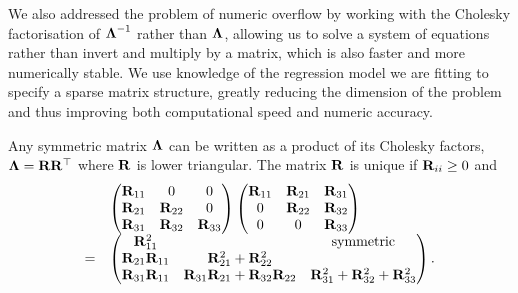 We also addressed the problem of numeric overflow by working with the Cholesky
factorisation of ${\boldsymbol \Lambda}^{-1}$ rather than ${\boldsymbol \Lambda}$, allowing us to solve a
system of equations rather than invert and multiply by a matrix, which is also
faster and more numerically stable. We use knowledge of the regression  model
we are fitting to specify a sparse matrix structure, greatly reducing the
dimension of   the problem and thus improving both computational speed and
numeric accuracy.

	
Any symmetric matrix ${\boldsymbol \Lambda}$ can be written as a product of its Cholesky
factors, ${\boldsymbol \Lambda} = {\bf R} {\bf R}^\top$ where ${\bf R}$ is lower triangular. The matrix
${\bf R}$ is unique if ${\bf R}_{ii} \geq 0$ and
\begin{equation*}
\label{eq:cholesky_factorisation}
\begin{array}{lll}
	&\begin{pmatrix}
	{\bf R}_{11}          & 0                                    & 0                                     \\
	{\bf R}_{21}          & {\bf R}_{22}                             & 0                                     \\
	{\bf R}_{31}          & {\bf R}_{32}                             & {\bf R}_{33}                              
	\end{pmatrix}
	\begin{pmatrix}
	{\bf R}_{11}          & {\bf R}_{21}                             & {\bf R}_{31}                              \\
	0                 & {\bf R}_{22}                             & {\bf R}_{32}                              \\
	0                 & 0                                    & {\bf R}_{33}                              
	\end{pmatrix}
	\\
	=& \begin{pmatrix}
	{\bf R}_{11}^2        &                                      & \text{symmetric}                      \\
	{\bf R}_{21}{\bf R}_{11} & {\bf R}_{21}^2 + {\bf R}_{22}^2 \\
	{\bf R}_{31} {\bf R}_{11} & {\bf R}_{31}{\bf R}_{21} + {\bf R}_{32} {\bf R}_{22} & {\bf R}_{31}^2 + {\bf R}_{32} ^2 + {\bf R}_{33}^2 
	\end{pmatrix}.
\end{array}
\end{equation*}

